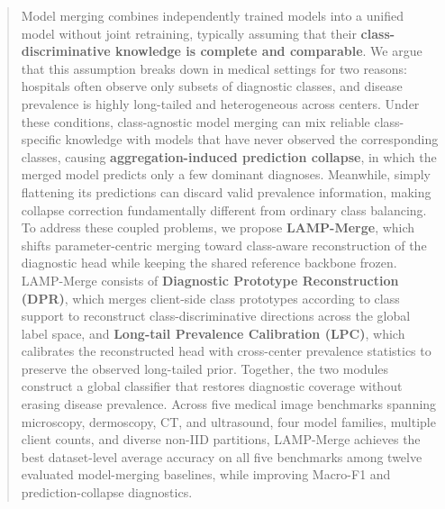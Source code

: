 \documentclass[letterpaper]{article} %
\begin{document}
\begin{abstract}
Model merging combines independently trained models into a unified model without joint retraining, typically assuming that their \textbf{class-discriminative knowledge is complete and comparable}. We argue that this assumption breaks down in medical settings for two reasons: hospitals often observe only subsets of diagnostic classes, and disease prevalence is highly long-tailed and heterogeneous across centers. Under these conditions, class-agnostic model merging can mix reliable class-specific knowledge with models that have never observed the corresponding classes, causing \textbf{aggregation-induced prediction collapse}, in which the merged model predicts only a few dominant diagnoses. Meanwhile, simply flattening its predictions can discard valid prevalence information, making collapse correction fundamentally different from ordinary class balancing. To address these coupled problems, we propose \textbf{LAMP-Merge}, which shifts parameter-centric merging toward class-aware reconstruction of the diagnostic head while keeping the shared reference backbone frozen. LAMP-Merge consists of \textbf{Diagnostic Prototype Reconstruction (DPR)}, which merges client-side class prototypes according to class support to reconstruct class-discriminative directions across the global label space, and \textbf{Long-tail Prevalence Calibration (LPC)}, which calibrates the reconstructed head with cross-center prevalence statistics to preserve the observed long-tailed prior. Together, the two modules construct a global classifier that restores diagnostic coverage without erasing disease prevalence. Across five medical image benchmarks spanning microscopy, dermoscopy, CT, and ultrasound, four model families, multiple client counts, and diverse non-IID partitions, LAMP-Merge achieves the best dataset-level average accuracy on all five benchmarks among twelve evaluated model-merging baselines, while improving Macro-F1 and prediction-collapse diagnostics.
\end{abstract}

\end{document}
